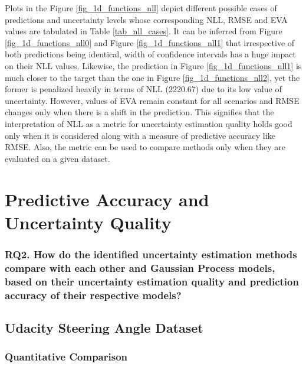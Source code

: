  
Plots in the Figure \ref{fig_1d_functions_nll} depict different possible cases of predictions and uncertainty levels whose corresponding NLL, RMSE and EVA values are tabulated in Table \ref{tab_nll_cases}. It can be inferred from Figure \ref{fig_1d_functions_nll0} and Figure \ref{fig_1d_functions_nll1} that irrespective of both predictions being identical, width of confidence intervals has a huge impact on their NLL values. Likewise, the prediction in Figure \ref{fig_1d_functions_nll1} is much closer to the target than the one in Figure \ref{fig_1d_functions_nll2}, yet the former is penalized heavily in terms of NLL (2220.67) due to its low value of uncertainty. However, values of EVA remain constant for all scenarios and RMSE changes only when there is a shift in the prediction. This signifies that the interpretation of NLL as a metric for uncertainty estimation quality holds good only when it is considered along with a measure of predictive accuracy like RMSE. Also, the metric can be used to compare methods only when they are evaluated on a given dataset.

\vfill\section{Predictive Accuracy and Uncertainty Quality}
\subsubsection{\textbf{RQ2.} How do the identified uncertainty estimation methods compare with each other and Gaussian Process models, based on their uncertainty estimation quality and prediction accuracy of their respective models?}
\subsection{Udacity Steering Angle Dataset}
\subsubsection{Quantitative Comparison}

